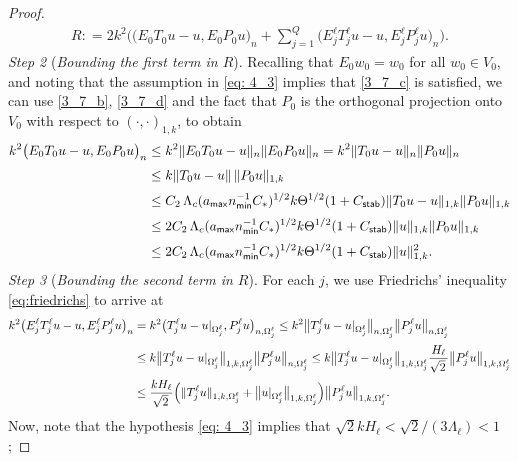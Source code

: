 \documentclass[numbers,webpdf,imaiai]{ima-authoring-template}%
\theoremstyle{thmstyletwo}%
\numberwithin{equation}{section}
\newcommand{\Cstar}{C_{\ast}}
\newcommand{\assign}{\mathrel{\mathop:}=}
\numberwithin{equation}{section}
\newcommand{\Cstab}{C_{\textup{\textsf{stab}}}}
\newcommand{\amax}{a_{\textup{\textsf{max}}}}
\newcommand{\nmin}{n_{\textup{\textsf{min}}}}
\begin{document}
{\begin{proof}
\begin{align}
	R \assign 2k^2 \biggl( \bigl(E_0 T_0 u - u, E_0 P_0u\bigr)_n 
	+ \sum^{Q}_{j=1} \bigl(E^{\ell}_j T^{\ell}_j u - u, E^{\ell}_j P^{\ell}_j u\bigr)_n \biggr). 
\end{align}
\textit{Step 2} (\textit{Bounding the first term in $R$}).
Recalling that $E_0 w_0 = w_0$ for all $w_0\in V_0$, and noting that the assumption in \eqref{eq: 4_3} implies that \eqref{3_7_c} is satisfied,
we can use \eqref{3_7_b}, \eqref{3_7_d} and the fact that $P_0$ is the orthogonal projection onto $V_0$ 
with respect to $(\cdot, \cdot)_{1,k}$, to obtain
\begin{align}
	k^2\bigl(E_0 T_0 u - u, E_0 P_0 u\bigr)_n
	&\le k^2 \|E_0 T_0 u - u\|_n \|E_0 P_0 u\|_n
	= k^2\| T_0 u -u\|_n \| P_0 u\|_n
	\nonumber\\[0.5ex]
	&\le k\|T_0 u -u\|\, \|P_0 u\|_{1,k}
	\nonumber\\[0.5ex]
	&\le C_2\, \Lambda_c (\amax \nmin^{-1} \Cstar)^{1/2}
	k \Theta^{1/2} (1+\Cstab)\|T_0 u - u\|_{1,k}\|P_0 u\|_{1,k}
	\nonumber\\[0.5ex]
	&\le 2C_2\, \Lambda_c (\amax \nmin^{-1} \Cstar)^{1/2}
	k \Theta^{1/2} (1+\Cstab)\|u\|_{1,k}\|P_0 u\|_{1,k}
	\nonumber\\[0.5ex]
	&\le 2C_2\, \Lambda_c (\amax \nmin^{-1} \Cstar)^{1/2}
	k \Theta^{1/2} (1+\Cstab)\|u\|_{1,k}^2.
	\label{eq:10_0}
\end{align}
\textit{Step 3} (\textit{Bounding the second term in $R$}).
For each $j$, we use Friedrichs' inequality \eqref{eq:friedrichs} to arrive at
\begin{align}
	k^2\bigl(E^{\ell}_j T^{\ell}_j u-u,E^{\ell}_j P^{\ell}_j u\bigr)_n 
	&= k^2\bigl({T^{\ell}_j} u-u|_{\Omega^{\ell}_j}, P^{\ell}_j u\bigr)_{n,\Omega^{\ell}_j}
	\le k^2 \big\|T^{\ell}_j u-u|_{\Omega^{\ell}_j}\big\|_{n,\Omega^{\ell}_j}\big\|P^{\ell}_j u\big\|_{n,\Omega^{\ell}_j}
	\nonumber\\[0.5ex]
	&\le k\bigl\|T^{\ell}_j u-u|_{\Omega^{\ell}_j}\big\|_{1,k,\Omega^{\ell}_j}\big\|{P^{\ell}_j} u\big\|_{n,\Omega^{\ell}_j}
	\le k\bigl\|{T^{\ell}_j} u-u|_{\Omega^{\ell}_j}\big\|_{1,k,\Omega^{\ell}_j}
	\frac{H_{\ell}}{\sqrt{2}\,}\big\|{P^{\ell}_j} u\big\|_{1,k,\Omega^{\ell}_j}
	\nonumber\\[0.5ex]
	&\le \frac{k H_{\ell}}{\sqrt{2}\,}
	\Bigl(\|{T^{\ell}_j} u\|_{1,k,\Omega^{\ell}_j}+\big\|u|_{\Omega^{\ell}_j}\big\|_{1,k,{\Omega^{\ell}_j}}\Bigr)
	\big\|P^{\ell}_j u\big\|_{1,k,\Omega^{\ell}_j}.
   \label{lemma411}
\end{align}
Now, note that the hypothesis \eqref{eq: 4_3} implies that $\sqrt{2} k {H_{\ell}} < \sqrt{2}/(3 \Lambda_\ell) < 1$; 

\end{proof}}
\end{document}

